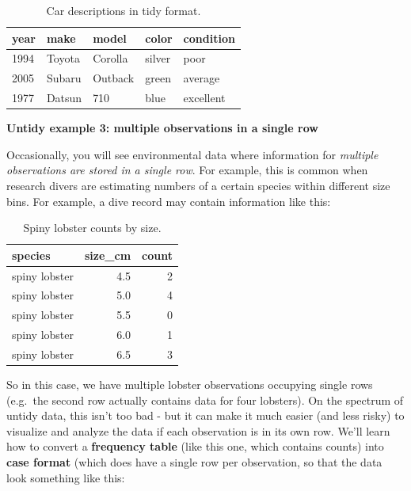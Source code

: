 \documentclass[
]{book}
\begin{document}
\begin{table}

\caption{\label{tab:unnamed-chunk-5}Car descriptions in tidy format.}
\centering
\begin{tabular}[t]{l|l|l|l|l}
\hline
year & make & model & color & condition\\
\hline
1994 & Toyota & Corolla & silver & poor\\
\hline
2005 & Subaru & Outback & green & average\\
\hline
1977 & Datsun & 710 & blue & excellent\\
\hline
\end{tabular}
\end{table}

\textbf{Untidy example 3: multiple observations in a single row}

Occasionally, you will see environmental data where information for \emph{multiple observations are stored in a single row}. For example, this is common when research divers are estimating numbers of a certain species within different size bins. For example, a dive record may contain information like this:

\begin{table}

\caption{\label{tab:unnamed-chunk-6}Spiny lobster counts by size.}
\centering
\begin{tabular}[t]{l|r|r}
\hline
species & size\_cm & count\\
\hline
spiny lobster & 4.5 & 2\\
\hline
spiny lobster & 5.0 & 4\\
\hline
spiny lobster & 5.5 & 0\\
\hline
spiny lobster & 6.0 & 1\\
\hline
spiny lobster & 6.5 & 3\\
\hline
\end{tabular}
\end{table}

So in this case, we have multiple lobster observations occupying single rows (e.g.~the second row actually contains data for four lobsters). On the spectrum of untidy data, this isn't too bad - but it can make it much easier (and less risky) to visualize and analyze the data if each observation is in its own row. We'll learn how to convert a \textbf{frequency table} (like this one, which contains counts) into \textbf{case format} (which does have a single row per observation, so that the data look something like this:
\end{document}
